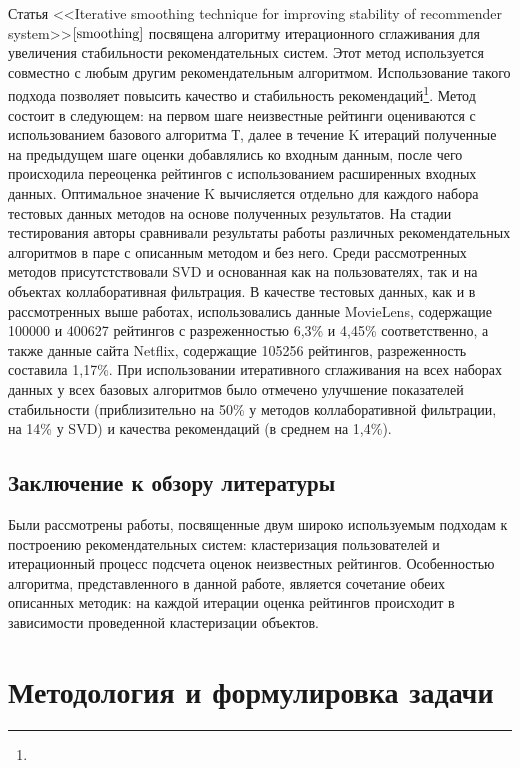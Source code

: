 \documentclass[a4paper, 12pt]{article} %
\begin{document}
\par
Статья <<Iterative smoothing technique for improving stability of recommender system>>$\cite{smoothing}$ посвящена алгоритму итерационного сглаживания для увеличения стабильности рекомендательных систем. Этот метод используется совместно с любым другим рекомендательным алгоритмом. Использование такого подхода позволяет повысить качество и стабильность рекомендаций\footnote{}. Метод состоит в следующем: на первом шаге неизвестные рейтинги оцениваются с использованием базового алгоритма Т, далее в течение K итераций полученные на предыдущем шаге оценки добавлялись ко входным данным, после чего происходила переоценка рейтингов с использованием расширенных входных данных. Оптимальное значение K вычисляется отдельно для каждого набора тестовых данных методов на основе полученных результатов. На стадии тестирования авторы сравнивали результаты работы различных рекомендательных алгоритмов в паре с описанным методом и без него. Среди рассмотренных методов присутстствовали SVD и основанная как на пользователях, так и на объектах коллаборативная фильтрация. В качестве тестовых данных, как и в рассмотренных выше работах, использовались данные MovieLens, содержащие 100000 и 400627 рейтингов с разреженностью 6,3\% и 4,45\% соответственно, а также данные сайта Netflix, содержащие 105256 рейтингов, разреженность составила 1,17\%. При использовании итеративного сглаживания на всех наборах данных у всех базовых алгоритмов было отмечено улучшение показателей стабильности (приблизительно на 50\% у методов коллаборативной фильтрации, на 14\% у SVD) и качества рекомендаций (в среднем на 1,4\%). 

\subsection{Заключение к обзору литературы}
Были рассмотрены работы, посвященные двум широко используемым подходам к построению рекомендательных систем: кластеризация пользователей и итерационный процесс подсчета оценок неизвестных рейтингов. Особенностью алгоритма, представленного в данной работе, является сочетание обеих описанных методик: на каждой итерации оценка рейтингов происходит в зависимости проведенной кластеризации объектов. 


\section{Методология и формулировка задачи}
\end{document}
